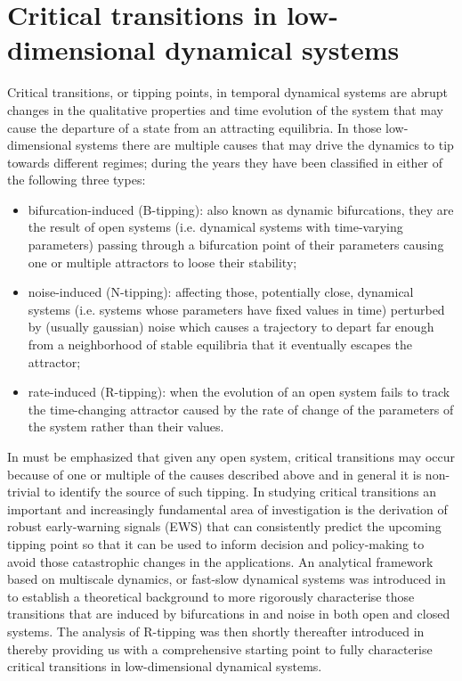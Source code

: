 \documentclass[../main.tex]{subfiles}
\begin{document}
\newpage
\section{Critical transitions in low-dimensional dynamical systems}\label{sec2}
Critical transitions, or tipping points, in temporal dynamical systems are abrupt changes in the qualitative properties and time evolution of the system that may cause the departure of a state from an attracting equilibria. In those low-dimensional systems there are multiple causes that may drive the dynamics to tip towards different regimes; during the years they have been classified in either of the following three types:
\begin{itemize}
     \item bifurcation-induced (B-tipping): also known as dynamic bifurcations, they are the result of open systems (i.e. dynamical systems with time-varying parameters) passing through a bifurcation point of their parameters causing one or multiple attractors to loose their stability;
     \item noise-induced (N-tipping): affecting those, potentially close, dynamical systems (i.e. systems whose parameters have fixed values in time) perturbed by (usually gaussian) noise which causes a trajectory to depart far enough from a neighborhood of stable equilibria that it eventually escapes the attractor;
     \item rate-induced (R-tipping): when the evolution of an open system fails to track the time-changing attractor caused by the rate of change of the parameters of the system rather than their values.
\end{itemize}
In must be emphasized that given any open system, critical transitions may occur because of one or multiple of the causes described above and in general it is non-trivial to identify the source of such tipping.
In studying critical transitions an important and increasingly fundamental area of investigation is the derivation of robust early-warning signals (EWS) that can consistently predict the upcoming tipping point so that it can be used to inform decision and policy-making to avoid those catastrophic changes in the applications. 
An analytical framework based on multiscale dynamics, or fast-slow dynamical systems was introduced in \cite{Kuehn11} to establish a theoretical background to more rigorously characterise those transitions that are induced by bifurcations in and noise in both open and closed systems.
The analysis of R-tipping was then shortly thereafter introduced in \cite{Ashwin12} thereby providing us with a comprehensive starting point to fully characterise critical transitions in low-dimensional dynamical systems.
\end{document}
